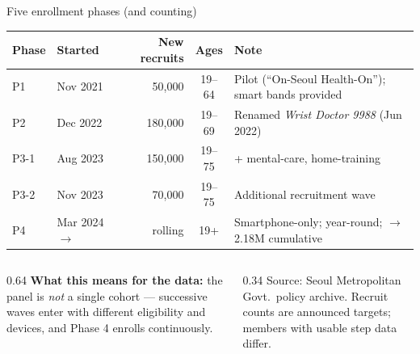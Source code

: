 \documentclass[10pt,aspectratio=169]{beamer}
\newcommand{\src}[1]{{\color{graytx}\scriptsize Source: #1}}
\begin{document}
\begin{frame}{Five enrollment phases (and counting)}
  \centering
  \renewcommand{\arraystretch}{1.25}
  \footnotesize
  \begin{tabular}{@{}l l r c >{\raggedright\arraybackslash}p{4.8cm}@{}}
    \toprule
    \textbf{Phase} & \textbf{Started} & \textbf{New recruits} & \textbf{Ages} & \textbf{Note}\\
    \midrule
    P1   & Nov 2021 & 50{,}000  & 19--64 & Pilot (``On-Seoul Health-On''); smart bands provided\\
    P2   & Dec 2022 & 180{,}000 & 19--69 & Renamed \textit{Wrist Doctor 9988} (Jun 2022)\\
    P3-1 & Aug 2023 & 150{,}000 & 19--75 & + mental-care, home-training\\
    P3-2 & Nov 2023 & 70{,}000  & 19--75 & Additional recruitment wave\\
    P4   & Mar 2024\,$\to$ & rolling & 19+ & Smartphone-only; year-round; $\to$ 2.18M cumulative\\
    \bottomrule
  \end{tabular}
  \vfill
  \begin{columns}[T]
    \begin{column}{0.64\textwidth}
      {\color{ink}\bfseries\footnotesize What this means for the data:} the panel is \emph{not} a single cohort --- successive waves enter with different eligibility and devices, and Phase 4 enrolls continuously.
    \end{column}
    \begin{column}{0.34\textwidth}
      \src{Seoul Metropolitan Govt.\ policy archive. Recruit counts are announced targets; members with usable step data differ.}
    \end{column}
  \end{columns}
\end{frame}
\end{document}
